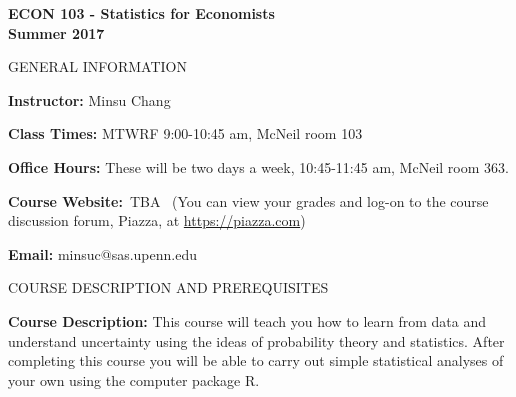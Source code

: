 \documentclass[11pt, letterpaper]{article}
\begin{document}
\thispagestyle{plain}

\begin{center}
\Large
\sc
\textbf{ECON 103 - Statistics for Economists}\\
\large
\textbf{Summer 2017}
\end{center}

\normalsize
\bigskip

\begin{center}
\small
GENERAL INFORMATION
\end{center}

\noindent \textbf{Instructor:} Minsu Chang 

\medskip

\noindent \textbf{Class Times:} MTWRF 9:00-10:45 am, McNeil room 103

\medskip


\noindent \textbf{Office Hours:} These will be two days a week, 10:45-11:45 am, McNeil room 363.


\medskip

 
\noindent \textbf{Course Website:\,} TBA \,%
(You can view your grades and log-on to the course discussion forum, Piazza, at \url{https://piazza.com})

\medskip

\noindent \textbf{Email:} minsuc@sas.upenn.edu


\vspace{0.2in}

\begin{center}
\small
COURSE DESCRIPTION AND PREREQUISITES
\end{center}


\noindent \textbf{Course Description:} 
This course will teach you how to learn from data and understand uncertainty using the ideas of probability theory and statistics. 
After completing this course you will be able to carry out simple statistical analyses of your own using the computer package R.


\medskip

\end{document}
